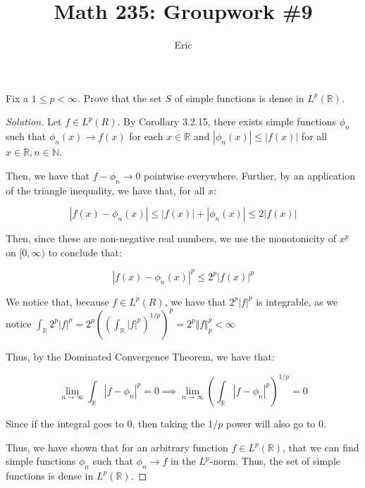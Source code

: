 \documentclass[10pt]{article}
\newenvironment{problem}[2][Problem]{\begin{trivlist}
\item[\hskip \labelsep {\bfseries #1}\hskip \labelsep {\bfseries #2.}]}{\end{trivlist}}
\begin{document}
\title{Math 235: Groupwork \#9}
\author{Eric}
\maketitle

\begin{problem}{1}

Fix a $1 \leq p < \infty$. Prove that the set $S$ of simple functions is dense in $L^p(\mathbb{R})$.

\end{problem}

\begin{proof}[Solution]

Let $f \in L^p(R)$. By Corollary 3.2.15, there exists simple functions $\phi_n$ such that $\phi_n(x) \to f(x)$ for each $x \in \mathbb{R}$ and $|\phi_n(x)| \leq |f(x)|$ for all $x \in \mathbb{R}, n \in \mathbb{N}$.

Then, we have that $f - \phi_n \to 0$ pointwise everywhere. Further, by an application of the triangle inequality, we have that, for all $x$:

$$|f(x) - \phi_n(x)| \leq |f(x)| + |\phi_n(x)| \leq 2|f(x)| $$

Then, since these are non-negative real numbers, we use the monotonicity of $x^p$ on $[0,\infty)$ to conclude that:

$$ | f(x) - \phi_n(x)|^p \leq 2^p |f(x)|^p $$

We notice that, because $f \in L^p(R)$, we have that $2^p |f|^p$ is integrable, as we notice $\int_{\mathbb{R}} 2^p |f|^p = 2^p \left(\left(\int_{\mathbb{R}} |f|^p\right)^{1/p}\right)^p = 2^p \Vert f \Vert_p^p < \infty$

Thus, by the Dominated Convergence Theorem, we have that:

$$ \lim_{n\to\infty} \int_\mathbb{R} |f - \phi_n|^p = 0 \implies \lim_{n\to\infty}  \left(\int_\mathbb{R} |f - \phi_n|^p \right)^{1/p}= 0$$

Since if the integral goes to $0$, then taking the $1/p$ power will also go to $0$.

Thus, we have shown that for an arbitrary function $f \in L^p(\mathbb{R})$, that we can find simple functions $\phi_n$ such that $\phi_n \to f$ in the $L^p$-norm. Thus, the set of simple functions is dense in $L^p(\mathbb{R})$.

\end{proof}
\end{document}
